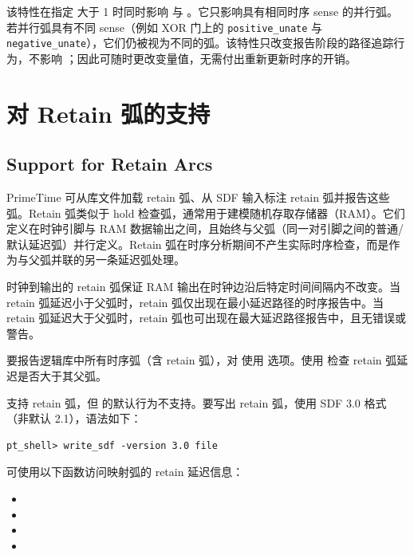 该特性在指定  大于 1 时同时影响  与 。它只影响具有相同时序 sense 的并行弧。若并行弧具有不同 sense（例如 XOR 门上的 \texttt{positive\_unate} 与 \texttt{negative\_unate}），它们仍被视为不同的弧。该特性只改变报告阶段的路径追踪行为，不影响 ；因此可随时更改变量值，无需付出重新更新时序的开销。

\section{对 Retain 弧的支持}
\subsection*{Support for Retain Arcs}

PrimeTime 可从库文件加载 retain 弧、从 SDF 输入标注 retain 弧并报告这些弧。Retain 弧类似于 hold 检查弧，通常用于建模随机存取存储器（RAM）。它们定义在时钟引脚与 RAM 数据输出之间，且始终与父弧（同一对引脚之间的普通/默认延迟弧）并行定义。Retain 弧在时序分析期间不产生实际时序检查，而是作为与父弧并联的另一条延迟弧处理。

时钟到输出的 retain 弧保证 RAM 输出在时钟边沿后特定时间间隔内不改变。当 retain 弧延迟小于父弧时，retain 弧仅出现在最小延迟路径的时序报告中。当 retain 弧延迟大于父弧时，retain 弧也可出现在最大延迟路径报告中，且无错误或警告。

要报告逻辑库中所有时序弧（含 retain 弧），对  使用  选项。使用  检查 retain 弧延迟是否大于其父弧。

 支持 retain 弧，但  的默认行为不支持。要写出 retain 弧，使用 SDF 3.0 格式（非默认 2.1），语法如下：
\begin{lstlisting}
pt_shell> write_sdf -version 3.0 file
\end{lstlisting}

可使用以下函数访问映射弧的 retain 延迟信息：
\begin{itemize}
  \item {}
  \item {}
  \item {}
  \item {}
\end{itemize}

